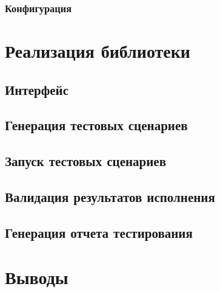 \documentclass[14pt, openany]{book}
\begin{document}
\subsection{Конфигурация}

\chapter{Реализация библиотеки}

\section{Интерфейс}

\section{Генерация тестовых сценариев}

\section{Запуск тестовых сценариев}

\section{Валидация результатов исполнения}

\section{Генерация отчета тестирования}

\chapter{Выводы}



\end{document}
